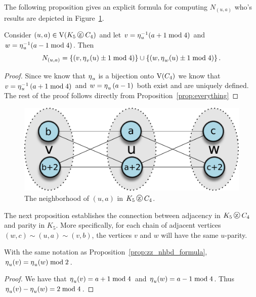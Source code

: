 \noindent
The following proposition gives an explicit formula for computing $N_{\left(u,a\right)}$ who's results are depicted in Figure~\ref{fig:zz_nhbd}.

 \begin{proposition}
    \label{prop:zz_nhbd_formula}
    Consider $\left( u, a \right)  \in \vertS{K_5 \zigzag C_{4}}$ and let $v = \operatorname{\eta}^{-1}_{u}( a + 1 \bmod{4})$ and  $w = \operatorname{\eta}^{-1}_{u}(a - 1 \bmod{4})$. Then \[ N_{\left(u,a \right) } =  \left\{  \left( v, \operatorname{\eta}_{v}( u ) \pm 1 \bmod{4} \right)   \right\}  \cup \left\{  \left(w, \operatorname{\eta}_{w}(u) \pm 1 \bmod{4} \right)  \right\}. \label{eq:nhbd-formula}   \]
  \end{proposition}

\begin{proof}

Since we know that $\operatorname{\eta}_{u}$ is a bijection onto $\mathrm{V}(C_4)$ we know that $v = \operatorname{\eta}_{u}^{-1}\left(a + 1 \bmod{4}\right)$ and $w = \operatorname{\eta}_{u}\left(a -1 \right)$ both exist and are uniquely defined. The rest of the proof follows directly from Proposition~\ref{prop:everything} 
  \end{proof}
\noindent

\begin{figure}[h]
  \centering
  \begin{minipage}{.50\textwidth}
  \includegraphics[height=.15\textheight]{pics/zig-zag-neighborhood}
  \caption{The neighborhood of $(u,a)$ in $K_5 \protect\zigzag C_4$.\label{fig:zz_nhbd}}
  \end{minipage}
\end{figure}

The next proposition establishes the connection between adjacency in $K_5 \zigzag C_4$ and parity in $K_5$. More specifically, for each chain of adjacent vertices $\left(w, c\right) \sim \left(u, a \right) \sim \left(v,b\right)$, the vertices $v$ and $w$ will have the same $u$-parity. 
 
 \begin{proposition}
 \label{prop:parity}
 With the same notation as Proposition~\ref{prop:zz_nhbd_formula},  $\operatorname{\eta}_u(v) =  \operatorname{\eta}_{u}(w) \bmod{2}$.
 \end{proposition}
 \begin{proof}

We have that $\operatorname{\eta}_{u}(v) = a + 1 \bmod{4}$ and $\operatorname{\eta}_{u}(w) = a -1 \bmod{4}$. Thus $\operatorname{\eta}_{u}(v) - \operatorname{\eta}_{u}(w) = 2 \bmod{4}$.
\end{proof}

